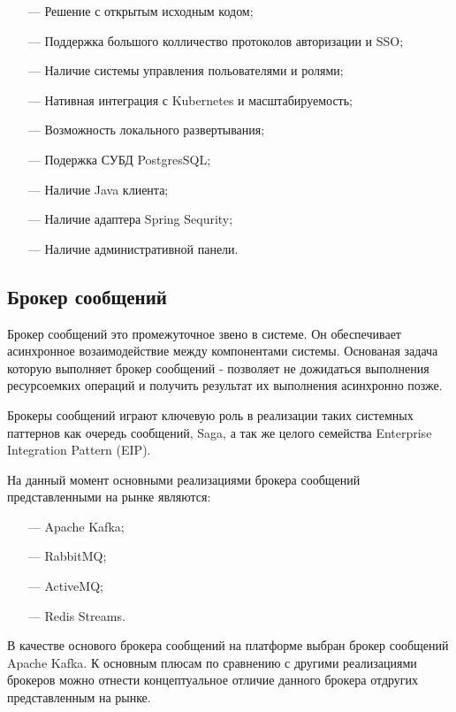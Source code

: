 \begin{itemize}
  \item[---] Решение с открытым исходным кодом;
  \item[---] Поддержка большого колличество протоколов авторизации и SSO;
  \item[---] Наличие системы управления польователями и ролями;
  \item[---] Нативная интеграция с Kubernetes и масштабируемость;
  \item[---] Возможность локального развертывания;
  \item[---] Подержка СУБД PostgresSQL;
  \item[---] Наличие Java клиента;
  \item[---] Наличие адаптера Spring Sequrity;
  \item[---] Наличие административной панели. 
\end{itemize}

\subsection{Брокер сообщений}

Брокер сообщений это промежуточное звено в системе. Он обеспечивает асинхронное возаимодействие между компонентами системы. Основаная задача которую выполняет брокер сообщений - позволяет не дожидаться выполнения ресурсоемких операций и получить результат их выполнения асинхронно позже. 

Брокеры сообщений играют ключевую роль в реализации таких системных паттернов как очередь сообщений\cite{raje2019performance}, Saga\cite{durr2021evaluation}, а так же целого семейства Enterprise Integration Pattern (EIP)\cite{hohpe2004enterprise}.

На данный момент основными реализациями брокера сообщений представленными на рынке являются:

\begin{itemize}
  \item[---] Apache Kafka;
  \item[---] RabbitMQ;
  \item[---] ActiveMQ;
  \item[---] Redis Streams.
\end{itemize}

В качестве основого брокера сообщений на платформе выбран брокер сообщений Apache Kafka.
К основным плюсам по сравнению с другими реализациями брокеров можно отнести концептуальное отличие данного брокера отдругих представленным на рынке.

